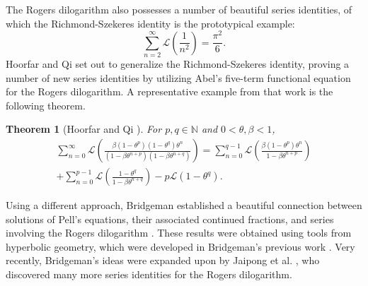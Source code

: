 \documentclass[10pt]{article}
\newtheorem{theorem}{Theorem}
\theoremstyle{definition}
\begin{document}
The Rogers dilogarithm also possesses a number of beautiful series identities, of which the Richmond-Szekeres identity \cite{Richmond_Szekeres_1981} is the prototypical example: 
\begin{equation*}
    \sum_{n=2}^{\infty}\mathcal{L}\left(\frac{1}{n^2}\right) = \frac{\pi^2}{6}.
\end{equation*}
Hoorfar and Qi \cite{hoorfar2009sums} set out to generalize the Richmond-Szekeres identity, proving a number of new series identities by utilizing Abel's five-term functional equation for the Rogers dilogarithm.  A representative example from that work is the following theorem.
\begin{theorem}[Hoorfar and Qi \cite{hoorfar2009sums}]
For $p,q \in \mathbb{N}$ and $0 < \theta, \beta < 1$,
\begin{multline*}
    \sum_{n=0}^{\infty}\mathcal{L}\left(\frac{\beta(1-\theta^p)(1-\theta^q)\theta^n}{(1-\beta\theta^{n+p})(1-\beta\theta^{n+q})}\right) = \sum_{n=0}^{q-1}\mathcal{L}\left(\frac{\beta(1-\theta^p)\theta^n}{1-\beta\theta^{n+p}}\right) \\ + \sum_{n=0}^{p-1}\mathcal{L}\left(\frac{1-\theta^q}{1-\beta\theta^{n+q}}\right) - p \mathcal{L}(1-\theta^q).
\end{multline*}
\end{theorem}
Using a different approach, Bridgeman established a beautiful connection between solutions of Pell's equations, their associated continued fractions, and series involving the Rogers dilogarithm \cite{bridgeman2021dilogarithm}.  These results were obtained using tools from hyperbolic geometry, which were developed in Bridgeman's previous work \cite{bridgeman2011orthospectra}.  Very recently, Bridgeman's ideas were expanded upon by Jaipong et al. \cite{jaipong2023}, who discovered many more series identities for the Rogers dilogarithm.  
\end{document}
